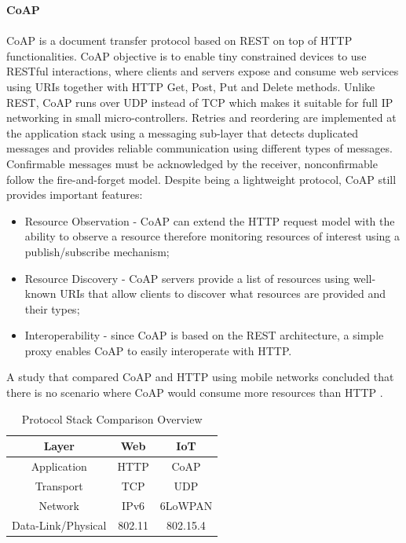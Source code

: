 \documentclass{sig-alternate-05-2015}
\begin{document}
\textbf{\gls{CoAP}}\\\\
	\gls{CoAP} \cite{Shelby2014} is a document transfer protocol based on \gls{REST} on top of \gls{HTTP} functionalities. \gls{CoAP} objective is to enable tiny constrained devices to use RESTful interactions, where clients and servers expose and consume web services using \gls{URIs} together with  \gls{HTTP} Get, Post, Put and Delete methods. Unlike \gls{REST}, \gls{CoAP} runs over \gls{UDP} instead of \gls{TCP} which makes it suitable for full IP networking in small micro-controllers. Retries and reordering are implemented at the application stack using a messaging sub-layer that detects duplicated messages and provides reliable communication using different types of messages. Confirmable messages must be acknowledged by the receiver, nonconfirmable follow the fire-and-forget model. Despite being a lightweight protocol, \gls{CoAP} still provides important features:
	
\begin{itemize}
	\item Resource Observation - \gls{CoAP} can extend the \gls{HTTP} request model with the ability to observe a resource therefore monitoring resources of interest using a publish/subscribe mechanism;
	\item Resource Discovery - \gls{CoAP} servers provide a list of resources using well-known {URIs} that allow clients to discover what resources are provided and their types;
	\item Interoperability - since \gls{CoAP} is based on the \gls{REST} architecture, a simple proxy enables \gls{CoAP} to easily interoperate with \gls{HTTP}.
\end{itemize}

A study that compared \gls{CoAP} and \gls{HTTP} using mobile networks concluded that there is no scenario where \gls{CoAP} would consume more resources than \gls{HTTP} \cite{Savolainen2014}.

\begin{table}[h]
	\centering
	\begin{center} \caption{Protocol Stack Comparison Overview } \label{tab:stack}\end{center}
	\begin{tabular}{c|c|c}
		Layer & Web & IoT \\
		\hline
		Application & \gls{HTTP} & \gls{CoAP} \\
		Transport & \gls{TCP} & \gls{UDP} \\
		Network & IPv6 & 6LoWPAN \\
		Data-Link/Physical & 802.11 & 802.15.4
	\end{tabular}
\end{table}
\end{document}
